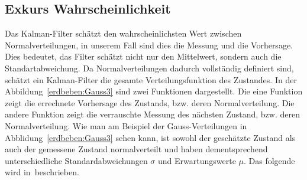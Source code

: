 \subsection{Exkurs Wahrscheinlichkeit} 
	\label{erdbeben:Wahrscheindlichkeit} 
Das Kalman-Filter schätzt den wahrscheinlichsten Wert zwischen Normalverteilungen, in unserem Fall sind dies die Messung und die Vorhersage.
Dies bedeutet, das Filter schätzt nicht nur den Mittelwert, sondern auch die Standartabweichung.
Da Normalverteilungen dadurch vollständig definiert sind, schätzt ein Kalman-Filter die gesamte Verteilungsfunktion des Zustandes.
In der Abbildung~\ref{erdbeben:Gauss3} sind zwei Funktionen dargestellt. 
Die eine Funktion zeigt die errechnete Vorhersage des Zustands, bzw. deren Normalverteilung. 
Die andere Funktion zeigt die verrauschte Messung des nächsten Zustand, bzw. deren Normalverteilung. 
Wie man am Beispiel der Gauss-Verteilungen in Abblidung~\ref{erdbeben:Gauss3} sehen kann, ist sowohl der geschätzte Zustand als auch der gemessene Zustand normalverteilt und haben dementsprechend unterschiedliche Standardabweichungen $\sigma$ und Erwartungswerte $\mu$. Das folgende wird in~\cite{erdbeben:aragher_understanding_2012}beschrieben.

